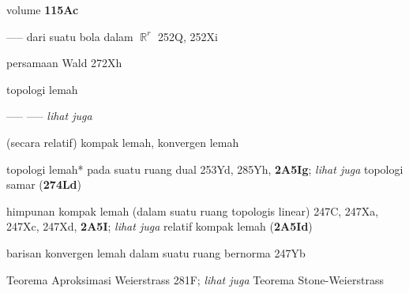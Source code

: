 volume {\bf 115Ac}

----- dari suatu bola dalam $\BbbR^r$ 252Q, 252Xi



\indexmedskip

persamaan Wald 272Xh




















{topologi lemah }





----- ----- {\it lihat juga}
 
(secara relatif) kompak lemah, 
konvergen lemah 




topologi lemah* pada suatu ruang dual 253Yd, 285Yh, {\bf 2A5Ig}; 
  {\it lihat juga} topologi samar ({\bf 274Ld})









himpunan kompak lemah (dalam suatu ruang topologis linear) 247C, 247Xa,
247Xc, 247Xd, {\bf 2A5I}; 
  {\it lihat juga}
relatif kompak lemah ({\bf 2A5Id})




barisan konvergen lemah dalam suatu ruang bernorma 247Yb



































Teorema Aproksimasi Weierstrass 281F;
  {\it lihat juga} Teorema Stone-Weierstrass





